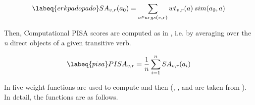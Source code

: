 \begin{equation} \labeq{erkpadopado}
SA_{v,r} (a_0) = \sum_{a \in args(v,r)} wt_{v,r}(a) \: sim(a_0,a)
\end{equation}

Then, Computational PISA scores are computed as in , i.e. by averaging  over the \textit{n} direct objects of a given transitive verb.

\begin{equation} \labeq{pisa}
PISA_{v,r} = \frac{1}{n} \sum_{i = 1}^{n} SA_{v,r} (a_i)
\end{equation}

In \textcite{CappelliLenciPISA} five weight functions are used to compute  and then  (, , and  are taken from \textcite{ErkEtAl2010}). In detail, the functions are as follows.
